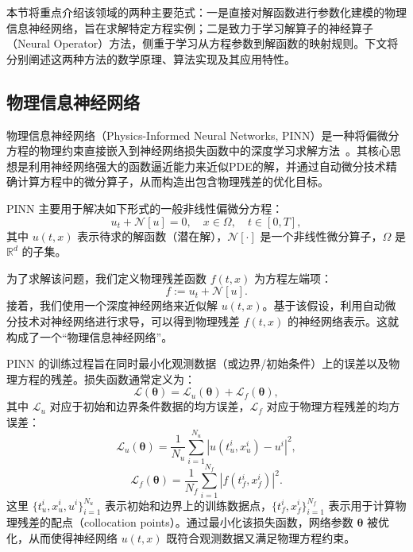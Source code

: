 本节将重点介绍该领域的两种主要范式：一是直接对解函数进行参数化建模的物理信息神经网络，旨在求解特定方程实例；二是致力于学习解算子的神经算子（Neural Operator）方法，侧重于学习从方程参数到解函数的映射规则。下文将分别阐述这两种方法的数学原理、算法实现及其应用特性。

\subsection{物理信息神经网络}
物理信息神经网络（Physics-Informed Neural Networks, PINN）是一种将偏微分方程的物理约束直接嵌入到神经网络损失函数中的深度学习求解方法~\cite{raissi2017physics, wang2021understanding, cuomo2022scientific, cai2021physics, farea2024understanding, cai2021physics, pang2019fpinns, huang2022applications}。其核心思想是利用神经网络强大的函数逼近能力来近似PDE的解，并通过自动微分技术精确计算方程中的微分算子，从而构造出包含物理残差的优化目标。

PINN 主要用于解决如下形式的一般非线性偏微分方程：
\begin{equation}
    u_t + \mathcal{N}[u] = 0, \quad x \in \Omega, \quad t \in [0, T],
\end{equation}
其中 $u(t, x)$ 表示待求的解函数（潜在解），$\mathcal{N}[\cdot]$ 是一个非线性微分算子，$\Omega$ 是 $\mathbb{R}^d$ 的子集。

为了求解该问题，我们定义物理残差函数 $f(t, x)$ 为方程左端项：
\begin{equation}
    f := u_t + \mathcal{N}[u].
\end{equation}
接着，我们使用一个深度神经网络来近似解 $u(t, x)$。基于该假设，利用自动微分技术对神经网络进行求导，可以得到物理残差 $f(t, x)$ 的神经网络表示。这就构成了一个“物理信息神经网络”。

PINN 的训练过程旨在同时最小化观测数据（或边界/初始条件）上的误差以及物理方程的残差。损失函数通常定义为：
\begin{equation}
    \mathcal{L}(\bm{\theta}) = \mathcal{L}_{u}(\bm{\theta}) + \mathcal{L}_{f}(\bm{\theta}),
\end{equation}
其中 $\mathcal{L}_{u}$ 对应于初始和边界条件数据的均方误差，$\mathcal{L}_{f}$ 对应于物理方程残差的均方误差：
\begin{equation}
    \mathcal{L}_{u}(\bm{\theta}) = \frac{1}{N_u} \sum_{i=1}^{N_u} \left| u(t_u^i, x_u^i) - u^i \right|^2,
\end{equation}
\begin{equation}
    \mathcal{L}_{f}(\bm{\theta}) = \frac{1}{N_f} \sum_{i=1}^{N_f} \left| f(t_f^i, x_f^i) \right|^2.
\end{equation}
这里 $\{t_u^i, x_u^i, u^i\}_{i=1}^{N_u}$ 表示初始和边界上的训练数据点，$\{t_f^i, x_f^i\}_{i=1}^{N_f}$ 表示用于计算物理残差的配点（collocation points）。通过最小化该损失函数，网络参数 $\bm{\theta}$ 被优化，从而使得神经网络 $u(t, x)$ 既符合观测数据又满足物理方程约束。

